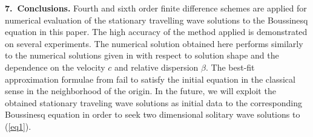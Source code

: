 \documentclass[leqno,11pt]{book}
\newcommand{\rf}[1]{(\ref{#1})}
\newcommand{\sect}[1]{\bigskip \par {\large\bf #1}}
\begin{document}
\bigskip

\sect{7.~Conclusions.}
Fourth and sixth order finite difference schemes are applied for numerical evaluation of the stationary travelling wave solutions to the Boussinesq equation in this paper. The high accuracy of the method applied is demonstrated on several experiments. The numerical solution obtained here performs similarly to the numerical solutions given in \cite{Ch2011,Ch2012} with respect to solution shape and the dependence on the velocity $c$ and relative dispersion $\beta$. 
The best-fit approximation formulae from  \cite{Ch2011} fail to satisfy the initial equation in the classical sense in the neighborhood of the origin. 
In the future, we will exploit the obtained stationary traveling wave solutions as initial data to the corresponding Boussinesq equation in order to seek two dimensional solitary wave solutions to \rf{eq1}.

\bigskip
\end{document}

